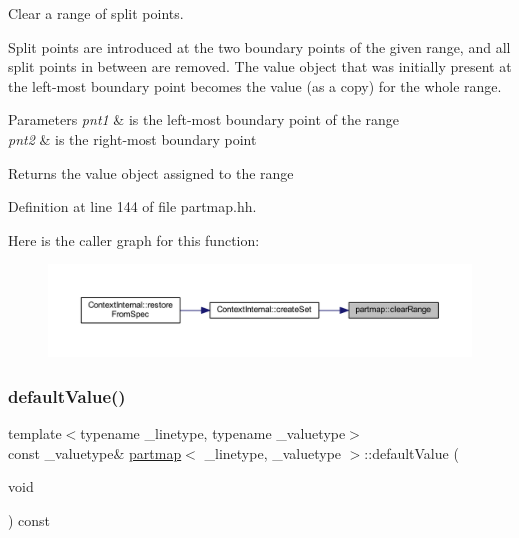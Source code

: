 Clear a range of split points. 

Split points are introduced at the two boundary points of the given range, and all split points in between are removed. The value object that was initially present at the left-\/most boundary point becomes the value (as a copy) for the whole range. 
\begin{DoxyParams}{Parameters}
{\em pnt1} & is the left-\/most boundary point of the range \\
\hline
{\em pnt2} & is the right-\/most boundary point \\
\hline
\end{DoxyParams}
\begin{DoxyReturn}{Returns}
the value object assigned to the range 
\end{DoxyReturn}


Definition at line 144 of file partmap.\+hh.

Here is the caller graph for this function\+:
\nopagebreak
\begin{figure}[H]
\begin{center}
\leavevmode
\includegraphics[width=350pt]{classpartmap_a3b1d7eb7e874b0f11ea3a578de6d0263_icgraph}
\end{center}
\end{figure}
\mbox{\label{classpartmap_a54e9c1e59dda87a818b92c8c32819b91}} 
\subsubsection{\texorpdfstring{defaultValue()}{defaultValue()}\hspace{0.1cm}{\footnotesize\ttfamily [1/2]}}
{\footnotesize\ttfamily template$<$typename \+\_\+linetype, typename \+\_\+valuetype$>$ \\
const \+\_\+valuetype\& \mbox{\hyperlink{classpartmap}{partmap}}$<$ \+\_\+linetype, \+\_\+valuetype $>$\+::default\+Value (\begin{DoxyParamCaption}\item[{void}]{ }\end{DoxyParamCaption}) const\hspace{0.3cm}{\ttfamily [inline]}}



